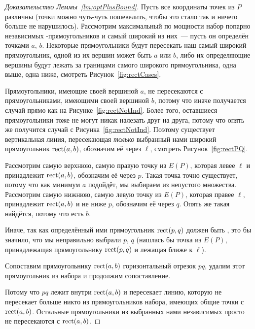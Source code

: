 \begin{proof}[Доказательство Леммы~\ref{lm:optPlusBound}]
Пусть все координаты точек из $P$ различны (точки можно чуть-чуть пошевелить, чтобы это стало так и ничего больше не нарушилось). Рассмотрим максимальный по мощности набор попарно независимых \tpl-прямоугольников и самый широкий из них~--- пусть он определён точками $a$, $b$. Некоторые прямоугольники будут пересекать наш самый широкий прямоугольник, одной из их вершин может быть $a$ или $b$, либо их определяющие вершины будут лежать за границами самого широкого прямоугольника, одна выше, одна ниже, смотреть Рисунок~\ref{fig:rectCases}.



Прямоугольники, имеющие своей вершиной $a$, не пересекаются с прямоугольниками, имеющими своей вершиной $b$, потому что иначе получается случай прямо как на Рисунке~\ref{fig:rectNotInd}. Более того, оставшиеся прямоугольники тоже не могут никак налезать друг на друга, потому что опять же получится случай с Рисунка~\ref{fig:rectNotInd}. Поэтому существует вертикальная линия, пересекающая {\it только} выбранный нами широкий прямоугольник $\operatorname{rect} (a,b)$, обозначим её через $\ell$, смотреть Рисунок~\ref{fig:rectPQ}.

Рассмотрим самую верхнюю, самую правую точку из $E(P)$, которая левее $\ell$ и принадлежит $\operatorname{rect} (a,b)$, обозначим её через $p$. Такая точка точно существует, потому что как минимум $a$ подойдёт, мы выбираем из непустого множества. Рассмотрим самую нижнюю, самую левую точку из $E(P)$, которая правее $\ell$, принадлежит $\operatorname{rect} (a,b)$ и не ниже $p$, обозначим её через $q$. Опять же такая найдётся, потому что есть $b$.


Иначе, так как определённый ими прямоугольник $\operatorname{rect} (p,q)$ должен быть \arbs, это бы значило, что мы неправильно выбрали $p$, $q$ (нашлась бы точка из $E(P)$, принадлежащая прямоугольнику $\operatorname{rect} (p,q)$ и лежащая ближе к $\ell$).

Сопоставим прямоугольнику $\operatorname{rect} (a,b)$ горизонтальный отрезок $pq$, удалим этот прямоугольник из набора и продолжим сопоставление.


Потому что $pq$ лежит внутри $\operatorname{rect}(a,b)$ и пересекает линию, которую не пересекает больше никто из прямоугольников набора, имеющих общие точки с $\operatorname{rect}(a,b)$. Остальные прямоугольники из выбранных нами независимых просто не пересекаются с $\operatorname{rect}(a,b)$.


\end{proof}

